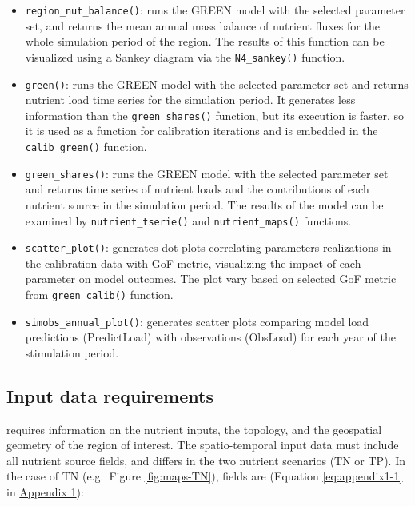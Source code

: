 \begin{itemize}
\item
  \texttt{region\_nut\_balance()}: runs the GREEN model with the selected parameter set, and returns the mean annual mass balance of nutrient fluxes for the whole simulation period of the region. The results of this function can be visualized using a Sankey diagram via the \texttt{N4\_sankey()} function.
\item
  \texttt{green()}: runs the GREEN model with the selected parameter set and returns nutrient load time series for the simulation period. It generates less information than the \texttt{green\_shares()} function, but its execution is faster, so it is used as a function for calibration iterations and is embedded in the \texttt{calib\_green()} function.
\item
  \texttt{green\_shares()}: runs the GREEN model with the selected parameter set and returns time series of nutrient loads and the contributions of each nutrient source in the simulation period. The results of the model can be examined by \texttt{nutrient\_tserie()} and \texttt{nutrient\_maps()} functions.
\item
  \texttt{scatter\_plot()}: generates dot plots correlating parameters realizations in the calibration data with GoF metric, visualizing the impact of each parameter on model outcomes. The plot vary based on selected GoF metric from \texttt{green\_calib()} function.
\item
  \texttt{simobs\_annual\_plot()}: generates scatter plots comparing model load predictions (PredictLoad) with observations (ObsLoad) for each year of the stimulation period.
\end{itemize}

\hypertarget{input-data-requirements}{%
\subsection{Input data requirements}\label{input-data-requirements}}

 requires information on the nutrient inputs, the topology, and the geospatial geometry of the region of interest. The spatio-temporal input data must include all nutrient source fields, and differs in the two nutrient scenarios (TN or TP). In the case of TN (e.g.~Figure \ref{fig:maps-TN}), fields are (Equation \eqref{eq:appendix1-1} in \protect\hyperlink{appendix-1}{Appendix 1}):

